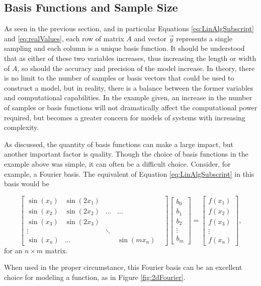 \subsection{Basis Functions and Sample Size}\label{Sect:samplesAndFunctions}
\par As seen in the previous section, and in particular Equations \ref{eq:LinAlgSubscript} and \ref{eq:realValues}, each row of matrix $A$ and vector $\vec{y}$ represents a single sampling and each column is a unique basis function. It should be understood that as either of these two variables increases, thus increasing the length or width of $A$, so should the accuracy and precision of the model increase. In theory, there is no limit to the number of samples or basis vectors that could be used to construct a model, but in reality, there is a balance between the former variables and computational capabilities. In the example given, an increase in the number of samples or basis functions will not dramatically affect the computational power required, but becomes a greater concern for models of systems with increasing complexity. 
\par As discussed, the quantity of basis functions can make a large impact, but another important factor is quality. Though the choice of basis functions in the example above was simple, it can often be a difficult choice. Consider, for example, a Fourier basis. The equivalent of Equation \ref{eq:LinAlgSubscript} in this basis would be

\begin{equation} \label{eq:fourierBasis}
\begin{bmatrix}
\sin(x_1) & \sin(2x_1) \\
\sin(x_2) & \sin(2x_2) & \ldots & \ldots \\
\sin(x_3) & \sin(2x_3) \\
\vdots & & \ddots & & \\
\sin(x_n) & \ldots & & \sin(mx_n)
\end{bmatrix}
\begin{bmatrix}
b_0 \\
b_1 \\
b_2 \\
\vdots \\
b_m 
\end{bmatrix}
=
\begin{bmatrix}
f(x_1) \\ 
f(x_2) \\
f(x_3) \\ 
\vdots \\
f(x_n)
\end{bmatrix},
\end{equation}
for an $n\times m$ matrix.
\par When used in the proper circumstance, this Fourier basis can be an excellent choice for modeling a function, as in Figure \ref{fig:2dFourier}.

